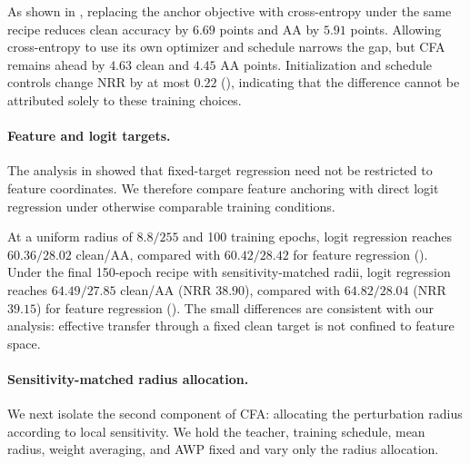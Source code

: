 As shown in , replacing the anchor objective with
cross-entropy under the same recipe reduces clean accuracy by \(6.69\)
points and AA by \(5.91\) points.
Allowing cross-entropy to use its own optimizer and schedule narrows the gap,
but CFA remains ahead by \(4.63\) clean and \(4.45\) AA points.
Initialization and schedule controls change NRR by at most \(0.22\)
(), indicating that the difference cannot be attributed
solely to these training choices.


\paragraph{Feature and logit targets.}

The analysis in  showed that fixed-target regression need
not be restricted to feature coordinates.
We therefore compare feature anchoring with direct logit regression under
otherwise comparable training conditions.

At a uniform radius of \(8.8/255\) and 100 training epochs, logit regression
reaches \(60.36/28.02\) clean/AA, compared with \(60.42/28.42\) for
feature regression ().
Under the final 150-epoch recipe with sensitivity-matched radii, logit
regression reaches \(64.49/27.85\) clean/AA (NRR \(38.90\)), compared with
\(64.82/28.04\) (NRR \(39.15\)) for feature regression
().
The small differences are consistent with our analysis: effective transfer
through a fixed clean target is not confined to feature space.


\paragraph{Sensitivity-matched radius allocation.}

We next isolate the second component of CFA: allocating the perturbation
radius according to local sensitivity.
We hold the teacher, training schedule, mean radius, weight averaging, and
AWP fixed and vary only the radius allocation.

